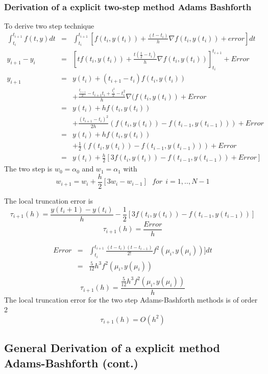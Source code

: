 \subsubsection*{Derivation of a explicit two-step method Adams Bashforth}
To derive two step  technique
\begin{eqnarray*}
\int_{t_i}^{t_{i+1}} f(t,y)dt &= &\int_{t_i}^{t_{i+1}}[f(t_i,y(t_i))+\frac{(t-t_i)}{h}\nabla f(t_i,y(t_i))+error]dt \\
y_{i+1}-y_i &= &[tf(t_i,y(t_i))+\frac{t(\frac{t}{2}-t_i)}{h}\nabla f(t_i,y(t_i))]_{t_i}^{t_{i+1}}+Error \\
y_{i+1}&=&y(t_i)+ (t_{i+1}-t_i)f(t_i,y(t_i))\\
& & +\frac{\frac{t_{i+1}}{2}-t_{i+1}t_i+\frac{t_i^2}{2}-t_i^2}{h}\nabla(f(t_i,y(t_i))+Error\\
&=&y(t_i)+ hf(t_i,y(t_i))\\
& & +\frac{(t_{i+1}-t_i)^2}{2h}(f(t_i,y(t_i))-f(t_{i-1},y(t_{i-1})))+Error\\
&=&y(t_i)+ hf(t_i,y(t_i))\\
& & +\frac{1}{2}(f(t_i,y(t_i))-f(t_{i-1},y(t_{i-1})))+Error\\
&=&y(t_i)+ \frac{h}{2}[3f(t_i,y(t_i))-f(t_{i-1},y(t_{i-1}))+Error]
\end{eqnarray*}
The two step  is $w_0=\alpha_0$ and $w_1=\alpha_1$ with
\[w_{i+1}=w_i+\frac{h}{2}[3w_{i}-w_{i-1}] \ \ \ for \ \ i=1,..,N-1 \]

The local truncation error is
\[\tau_{i+1}(h)=\frac{y(t_i+1)-y(t_i)}{h}-\frac{1}{2}[3f(t_i,y(t_i))-f(t_{i-1},y(t_{i-1})) ]  \]
\[\tau_{i+1}(h)=\frac{Error}{h}\]

\begin{eqnarray*}
Error &= &\int_{t_i}^{t_{i+1}} \frac{(t-t_i)(t-t_{i-1})}{2!} f^2(\mu_i,y(\mu_i))]dt \\
&=&\frac{5}{12}h^3f^2(\mu_i,y(\mu_i))\\
\end{eqnarray*}
\[\tau_{i+1}(h)=\frac{\frac{5}{12}h^3f^2(\mu_i,y(\mu_i))}{h}\]
The local truncation error for the two step Adams-Bashforth methods is of order 2
\[\tau_{i+1}(h)=O(h^2)\]

\subsection*{General Derivation of a explicit method Adams-Bashforth (cont.)}


